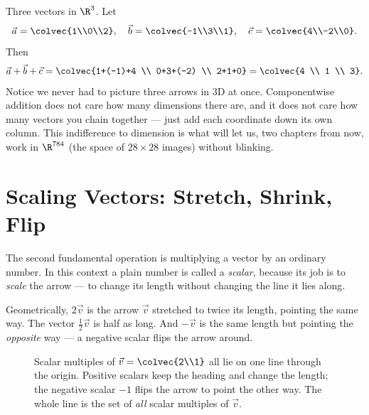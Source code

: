 \begin{example}
\label{ch02:ex-add3}
Three vectors in $\R^3$. Let
\[
  \vec{a}=\colvec{1\\0\\2},\quad
  \vec{b}=\colvec{-1\\3\\1},\quad
  \vec{c}=\colvec{4\\-2\\0}.
\]
Then
\[
  \vec{a}+\vec{b}+\vec{c}
  = \colvec{1+(-1)+4 \\ 0+3+(-2) \\ 2+1+0}
  = \colvec{4 \\ 1 \\ 3}.
\]
Notice we never had to picture three arrows in 3D at once. Componentwise addition does
not care how many dimensions there are, and it does not care how many vectors you chain
together --- just add each coordinate down its own column. This indifference to dimension
is what will let us, two chapters from now, work in $\R^{784}$ (the space of
$28\times 28$ images) without blinking.
\end{example}

\section{Scaling Vectors: Stretch, Shrink, Flip}
\label{ch02:scale}

The second fundamental operation is multiplying a vector by an ordinary number. In this
context a plain number is called a \emph{scalar}, because its job is to \emph{scale} the
arrow --- to change its length without changing the line it lies along.

Geometrically, $2\vec{v}$ is the arrow $\vec{v}$ stretched to twice its length, pointing
the same way. The vector $\tfrac{1}{2}\vec{v}$ is half as long. And $-\vec{v}$ is the same
length but pointing the \emph{opposite} way --- a negative scalar flips the arrow around.

\begin{figure}[H]
\centering
{}
\caption{Scalar multiples of $\vec{v}=\colvec{2\\1}$ all lie on one line through the
origin. Positive scalars keep the heading and change the length; the negative scalar
$-1$ flips the arrow to point the other way. The whole line is the set of \emph{all}
scalar multiples of $\vec{v}$.}
\label{ch02:fig-scale}
\end{figure}

